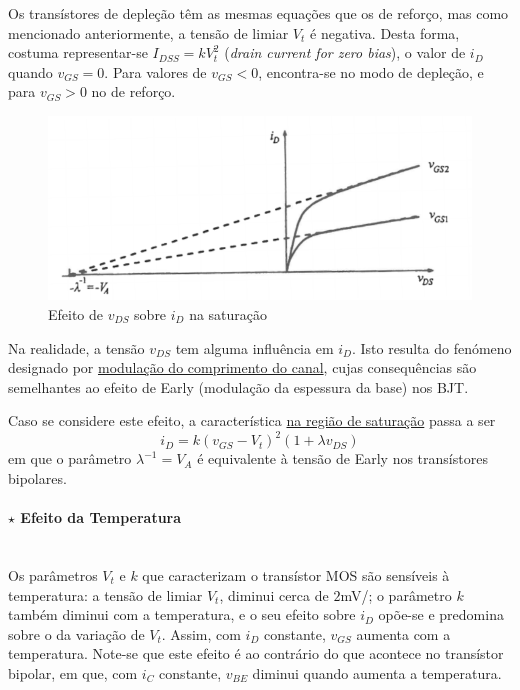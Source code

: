\noindent Os transístores de depleção têm as mesmas equações que os de reforço, mas como mencionado anteriormente, a tensão de limiar $V_t$ é negativa. Desta forma, costuma representar-se $I_{DSS} = kV^2_t$ (\textit{drain current for zero bias}), o valor de $i_D$ quando $v_{GS} = 0$. Para valores de $v_{GS} < 0$, encontra-se no modo de depleção, e para $v_{GS} > 0$ no de reforço. 

\begin{figure}[H]
    \centering
    \includegraphics[width = 0.6\linewidth]{img/3/MOSFET/MOS-early-effect.png}
    \caption{Efeito de $v_{DS}$ sobre $i_{D}$ na saturação \cite{medeiros:CTBM}}
    \label{fig:MOS-early-effect}
\end{figure}

\noindent Na realidade, a tensão $v_{DS}$ tem alguma influência em $i_D$. Isto resulta do fenómeno designado por \underline{modulação do comprimento do canal}, cujas consequências são semelhantes ao efeito de Early (modulação da espessura da base) nos BJT.

Caso se considere este efeito, a característica \underline{na região de saturação} passa a ser
$$
    \boxed{ i_D = k\left( v_{GS} - V_t \right)^2 (1 + \lambda v_{DS}) }
$$
em que o parâmetro $\lambda^{-1} = V_A$ é equivalente à tensão de Early nos transístores bipolares.

\paragraph[3.2.1.2 Efeito da Temperatura]{$\pmb{\star}$ Efeito da Temperatura}\mbox{}\\[4pt]
Os parâmetros $V_t$ e $k$ que caracterizam o transístor MOS são sensíveis à temperatura: a tensão de limiar $V_t$, diminui cerca de $2$mV/; o parâmetro $k$ também diminui com a temperatura, e o seu efeito sobre $i_D$ opõe-se e predomina sobre o da variação de $V_t$. Assim, com $i_D$ constante, $v_{GS}$ aumenta com a temperatura. Note-se que este efeito é ao contrário do que acontece no transístor bipolar, em que, com $i_C$ constante, $v_{BE}$ diminui quando aumenta a temperatura.

